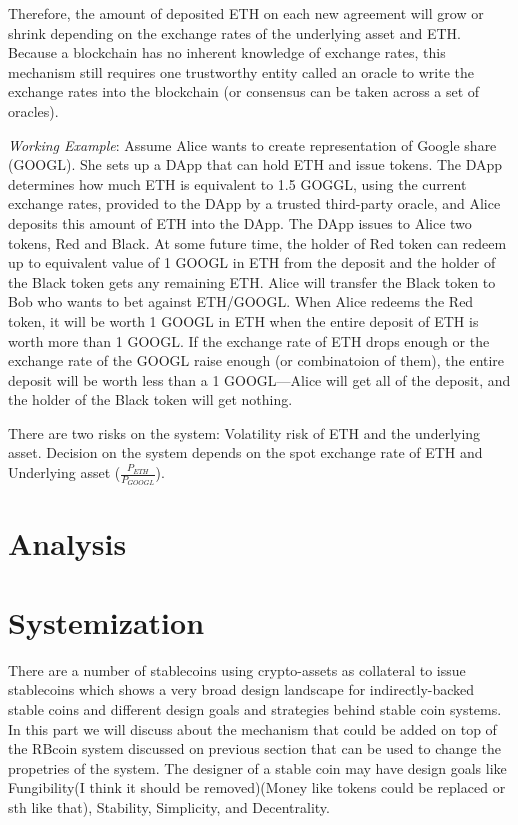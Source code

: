 \documentclass[runningheads]{llncs}
\begin{document}
Therefore, the amount of deposited ETH on each new agreement will grow or shrink depending on the exchange rates of the underlying asset and ETH. Because a blockchain has no inherent knowledge of exchange rates, this mechanism still requires one trustworthy entity called an oracle to write the exchange rates into the blockchain (or consensus can be taken across a set of oracles).

\emph{Working Example}: Assume Alice wants to create representation of Google share (GOOGL). She sets up a DApp that can hold ETH and issue tokens. The DApp determines how much ETH is equivalent to 1.5 GOGGL, using the current exchange rates, provided to the DApp by a trusted third-party oracle, and Alice deposits this amount of ETH into the DApp. The DApp issues to Alice two tokens, Red and Black. At some future time, the holder of Red token can redeem up to equivalent value of 1 GOOGL in ETH from the deposit and the holder of the Black token gets any remaining ETH. Alice will transfer the Black token to Bob who wants to bet against ETH/GOOGL. When Alice redeems the Red token, it will be worth 1 GOOGL in ETH when the entire deposit of ETH is worth more than 1 GOOGL. If the exchange rate of ETH drops enough or the exchange rate of the GOOGL raise enough (or combinatoion of them), the entire deposit will be worth less than a 1 GOOGL—Alice will get all of the deposit, and the holder of the Black token will get nothing.

There are two risks on the system: Volatility risk of ETH and the underlying asset. Decision on the system depends on the spot exchange rate of ETH and Underlying asset
($\frac{P_{ETH}}{P_{GOOGL}} $).


\section{Analysis}



\section{Systemization}
There are a number of stablecoins using crypto-assets as collateral to issue stablecoins which shows a very broad design landscape for indirectly-backed stable coins and different design goals and strategies behind stable coin systems. In this part we will discuss about the mechanism that could be added on top of the RBcoin system discussed on previous section that can be used to change the propetries of the system. The designer of a stable coin may have design goals like Fungibility(I think it should be removed)(Money like tokens could be replaced or sth like that), Stability, Simplicity, and Decentrality. 
\end{document}
